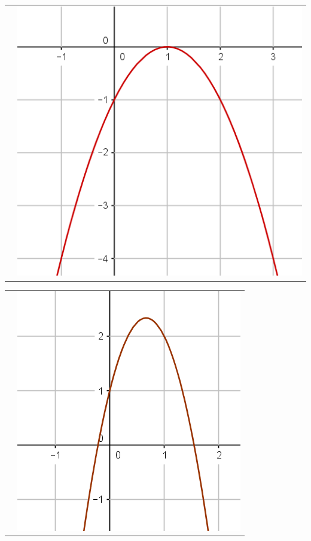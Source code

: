 \documentclass[12pt,a4paper]{article}
\begin{document}
\begin{tabular}{cc }
	 &
	
	\includegraphics[scale=0.25]{./img/fig_2}\\
\end{tabular}



\begin{tabular}{ll }
	 &
	
	\includegraphics[scale=0.25]{./img/fig_4}\\
\end{tabular}
	


	
\end{document}
